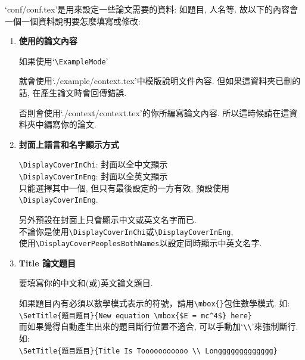 
`conf/conf.tex'是用來設定一些論文需要的資料: 如題目, 人名等. 故以下的內容會一個一個資料說明要怎麼填寫或修改:

\begin{enumerate}
  \item
  {
    \textbf{使用的論文內容}

    如果使用`\verb|\ExampleMode|'

    就會使用`./example/context.tex'中模版說明文件內容. 但如果這資料夾已刪的話, 在產生論文時會回傳錯誤.

    否則會使用`./context/context.tex'的你所編寫論文內容. 所以這時候請在這資料夾中編寫你的論文.
  } %

  \item
  {
    \textbf{封面上語言和名字顯示方式}

    \verb|\DisplayCoverInChi|:  封面以全中文顯示\\
    \verb|\DisplayCoverInEng|:  封面以全英文顯示\\
    只能選擇其中一個, 但只有最後設定的一方有效, 預設使用\verb|\DisplayCoverInEng|.

    另外預設在封面上只會顯示中文或英文名字而已.\\
    不論你是使用\verb|\DisplayCoverInChi|或\verb|\DisplayCoverInEng|,\\
    使用\verb|\DisplayCoverPeoplesBothNames|以設定同時顯示中英文名字.
  } %

  \item
  {
    \textbf{Title 論文題目}

    要填寫你的中文和(或)英文論文題目.

    如果題目內有必須以數學模式表示的符號，請用\verb|\mbox{}|包住數學模式. 如:\\
    \verb|\SetTitle{題目題目}{New equation \mbox{$E = mc^4$} here}|\\

    而如果覺得自動產生出來的題目斷行位置不適合, 可以手動加`\verb|\\|'來強制斷行. 如:\\
    \verb|\SetTitle{題目題目}{Title Is Tooooooooooo \\ Longgggggggggggg}|\\

}
\end{enumerate}
